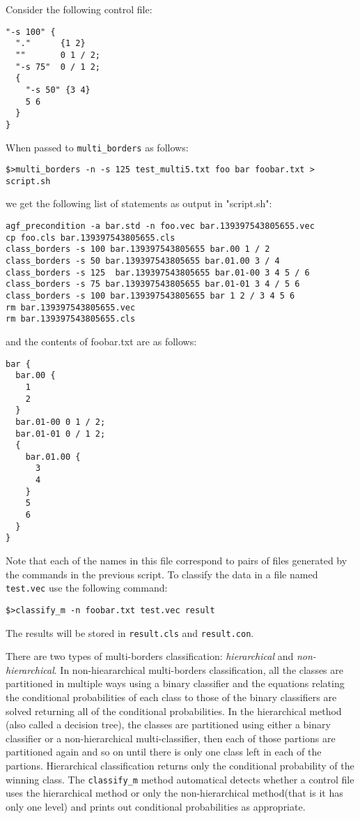 \documentclass[12pt]{article}
\begin{document}
Consider the following control file:

\begin{verbatim}
"-s 100" {
  "."      {1 2}
  ""       0 1 / 2;
  "-s 75"  0 / 1 2;
  {
    "-s 50" {3 4}
    5 6
  } 
}
\end{verbatim}

When passed to \verb/multi_borders/ as follows:

\begin{verbatim}
$>multi_borders -n -s 125 test_multi5.txt foo bar foobar.txt > script.sh
\end{verbatim}

we get the following list of statements as output in "script.sh":

\begin{verbatim}
agf_precondition -a bar.std -n foo.vec bar.139397543805655.vec
cp foo.cls bar.139397543805655.cls
class_borders -s 100 bar.139397543805655 bar.00 1 / 2
class_borders -s 50 bar.139397543805655 bar.01.00 3 / 4
class_borders -s 125  bar.139397543805655 bar.01-00 3 4 5 / 6
class_borders -s 75 bar.139397543805655 bar.01-01 3 4 / 5 6
class_borders -s 100 bar.139397543805655 bar 1 2 / 3 4 5 6
rm bar.139397543805655.vec
rm bar.139397543805655.cls
\end{verbatim}

and the contents of foobar.txt are as follows:

\begin{verbatim}
bar {
  bar.00 {
    1
    2 
  }
  bar.01-00 0 1 / 2;
  bar.01-01 0 / 1 2;
  {
    bar.01.00 {
      3
      4
    }
    5
    6
  }
}
\end{verbatim}

Note that each of the names in this file correspond to pairs of files generated by the commands in the previous script. To classify the data in a file named \verb"test.vec" use the following command:

\begin{verbatim}
$>classify_m -n foobar.txt test.vec result
\end{verbatim}

The results will be stored in \verb"result.cls" and \verb"result.con".

  There are two types of multi-borders classification: {\it hierarchical} and {\it non-hierarchical}.  In non-hieararchical multi-borders classification, all the classes are partitioned in multiple ways using a binary classifier and the equations relating the conditional probabilities of each class to those of the binary classifiers are solved returning all of the conditional probabilities.  In the hierarchical method (also called a decision tree), the classes are partitioned using either a binary classifier or a non-hierarchical multi-classifier, then each of those partions are partitioned again and so on until there is only one class left in each of the partions.  Hierarchical classification returns only the conditional probability of the winning class.  The \verb/classify_m/ method automatical detects whether a control file uses the hierarchical method or only the non-hierarchical method(that is it has only one level) and prints out conditional probabilities as appropriate.  
\end{document}
